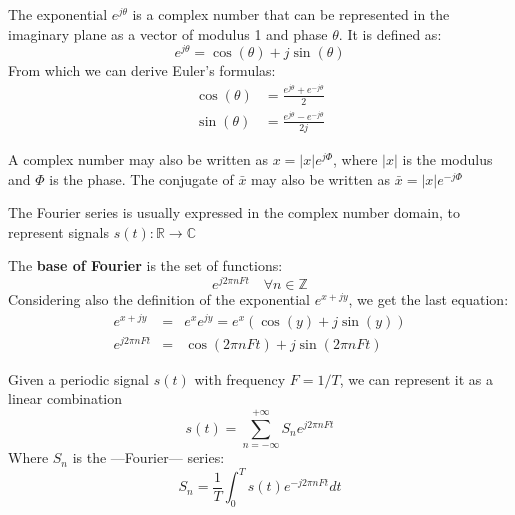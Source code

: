 \begin{definition}
   The exponential $e^{j\theta}$ is a complex number that can be represented in the imaginary plane as a vector of modulus 1 and phase $\theta$. It is defined as:
   \begin{equation}
      e^{j\theta} = \cos(\theta) + j\sin(\theta)
   \end{equation}
   From which we can derive Euler's formulas:
   \begin{align}
      \cos(\theta) & = \frac{e^{j\theta} + e^{-j\theta}}{2}\\
      \sin(\theta) & = \frac{e^{j\theta} - e^{-j\theta}}{2j}
   \end{align}
\end{definition}

A complex number may also be written as $x = |x|e^{j\Phi}$, where $|x|$ is the modulus and $\Phi$ is the phase.
The conjugate of $\bar{x}$ may also be written as $\bar{x} = |x|e^{-j\Phi}$

The Fourier series is usually expressed in the complex number domain, to represent signals $s(t): \mathbb{R} \rightarrow \mathbb{C}$

The \textbf{base of Fourier} is the set of functions:
\begin{equation}
   e^{j2\pi n F t} \quad\forall n \in \mathbb{Z}
\end{equation}
Considering also the definition of the exponential $e^{x + jy}$, we get the last equation:
\begin{align}
   e^{x + jy} & = & e^x e^{jy} =e^x(\cos(y) + j\sin(y))\\
   e^{j2\pi n F t} & = & \cos(2\pi n F t) + j\sin(2\pi n F t)
\end{align}
\nl


\newpage
\begin{definition}
   Given a periodic signal $s(t)$ with frequency $F = 1/T$, we can represent it as a linear combination
   \begin{equation}
      s(t) = \sum_{n=-\infty}^{+\infty} S_n e^{j2\pi n F t}
   \end{equation} 
   Where $S_n$ is the ---Fourier--- series:
   \begin{equation}
      S_n = \frac{1}{T} \int_0^T s(t) e^{-j2\pi n F t} dt
   \end{equation}
\end{definition}

